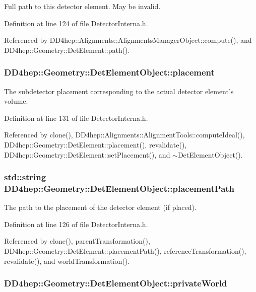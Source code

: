 Full path to this detector element. May be invalid. 

Definition at line 124 of file DetectorInterna.h.

Referenced by DD4hep::Alignments::AlignmentsManagerObject::compute(), and DD4hep::Geometry::DetElement::path().\hypertarget{class_d_d4hep_1_1_geometry_1_1_det_element_object_a7ee03e0b36f123f1ae48fda184303c2a}{
\subsubsection[{placement}]{ {\bf DD4hep::Geometry::DetElementObject::placement}}}
\label{class_d_d4hep_1_1_geometry_1_1_det_element_object_a7ee03e0b36f123f1ae48fda184303c2a}


The subdetector placement corresponding to the actual detector element's volume. 

Definition at line 131 of file DetectorInterna.h.

Referenced by clone(), DD4hep::Alignments::AlignmentTools::computeIdeal(), DD4hep::Geometry::DetElement::placement(), revalidate(), DD4hep::Geometry::DetElement::setPlacement(), and $\sim$DetElementObject().\hypertarget{class_d_d4hep_1_1_geometry_1_1_det_element_object_a64bf695379c82abca8e8054307a94861}{
\subsubsection[{placementPath}]{\setlength{\rightskip}{0pt plus 5cm}std::string {\bf DD4hep::Geometry::DetElementObject::placementPath}}}
\label{class_d_d4hep_1_1_geometry_1_1_det_element_object_a64bf695379c82abca8e8054307a94861}


The path to the placement of the detector element (if placed). 

Definition at line 126 of file DetectorInterna.h.

Referenced by clone(), parentTransformation(), DD4hep::Geometry::DetElement::placementPath(), referenceTransformation(), revalidate(), and worldTransformation().\hypertarget{class_d_d4hep_1_1_geometry_1_1_det_element_object_ace2a84b1e32a5263768b573df15d69ff}{
\subsubsection[{privateWorld}]{ {\bf DD4hep::Geometry::DetElementObject::privateWorld}}}
\label{class_d_d4hep_1_1_geometry_1_1_det_element_object_ace2a84b1e32a5263768b573df15d69ff}


